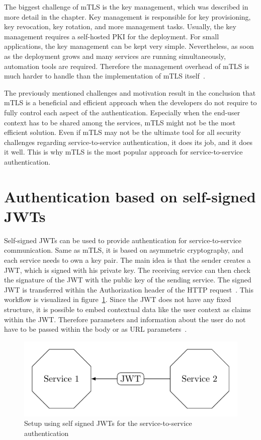 The biggest challenge of mTLS is the key management, which was described in more detail in the chapter.
Key management is responsible for key provisioning, key revocation, key rotation, and more management tasks.
Usually, the key management requires a self-hosted PKI for the deployment.
For small applications, the key management can be kept very simple.
Nevertheless, as soon as the deployment grows and many services are running simultaneously, automation tools are required.
Therefore the management overhead of mTLS is much harder to handle than the implementation of mTLS itself~\cite{dias2020microservices}.

The previously mentioned challenges and motivation result in the conclusion that mTLS is a beneficial and efficient approach when the developers do not require to fully control each aspect of the authentication.
Especially when the end-user context has to be shared among the services, mTLS might not be the most efficient solution.
Even if mTLS may not be the ultimate tool for all security challenges regarding service-to-service authentication, it does its job, and it does it well.
This is why mTLS is the most popular approach for service-to-service authentication.

\section{Authentication based on self-signed JWTs}
Self-signed JWTs can be used to provide authentication for service-to-service communication.
Same as mTLS, it is based on asymmetric cryptography, and each service needs to own a key pair.
The main idea is that the sender creates a JWT, which is signed with his private key.
The receiving service can then check the signature of the JWT with the public key of the sending service.
The signed JWT is transferred within the Authorization header of the HTTP request~\cite{dias2020microservices}.
This workflow is visualized in figure~\ref{fig:auth_mechanisms_jwt}.
Since the JWT does not have any fixed structure, it is possible to embed contextual data like the user context as claims within the JWT.
Therefore parameters and information about the user do not have to be passed within the body or as URL parameters~\cite{dias2020microservices}.

\begin{figure}
	\centering
	\includegraphics{images/authentication-mechanisms/TikZ_jwt_base_structure.pdf}
	\caption{Setup using self signed JWTs for the service-to-service authentication~\cite{dias2020microservices}}
	\label{fig:auth_mechanisms_jwt}
\end{figure}

